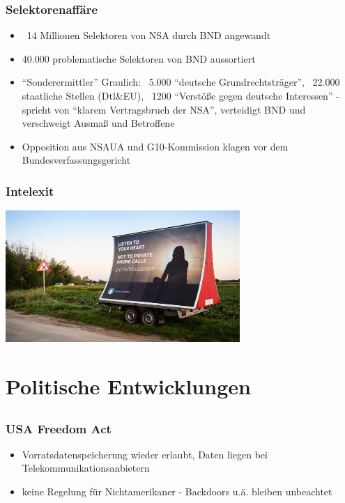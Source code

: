 \documentclass[12pt, xcolor={svgnames,table}]{beamer}
\begin{document}
\begin{frame}
  \frametitle{Selektorenaffäre}
    \small
    \begin{itemize}
      \item ~14 Millionen Selektoren von NSA durch BND angewandt
      \item 40.000 problematische Selektoren von BND aussortiert
      \item ``Sonderermittler'' Graulich: ~5.000 ``deutsche Grundrechtsträger'', ~22.000 staatliche Stellen (Dtl\&EU), ~1200 ``Verstöße gegen deutsche Interessen'' - spricht von ``klarem Vertragsbruch der NSA'', verteidigt BND und verschweigt Ausmaß und Betroffene
      \item Opposition aus NSAUA und G10-Kommission klagen vor dem Bundesverfassungsgericht
    \end{itemize}
\end{frame}

\begin{frame}
  \frametitle{Intelexit}
    \begin{center}
      \includegraphics[height=5cm]{img/intelexit.jpg}
    \end{center}
\end{frame}

\section{Politische Entwicklungen}
\subsection{}

\begin{frame}
  \frametitle{USA Freedom Act}
    \footnotesize
    \begin{itemize}
      \item Vorratsdatenspeicherung wieder erlaubt, Daten liegen bei Telekommunikationsanbietern
      \item keine Regelung für Nichtamerikaner - Backdoors u.ä. bleiben unbeachtet
    \end{itemize}
\end{frame}
\end{document}
